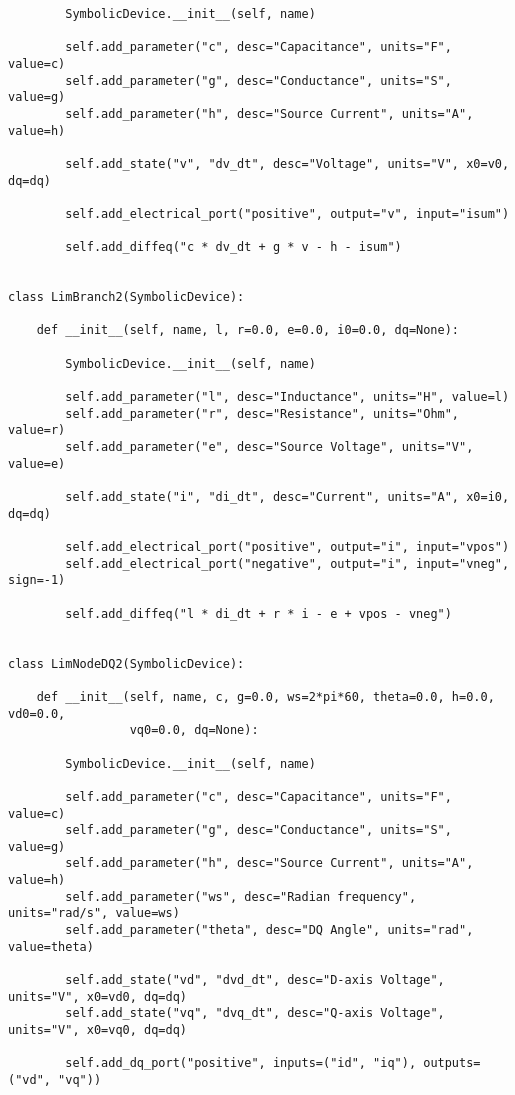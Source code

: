 \begin{lstlisting}
        SymbolicDevice.__init__(self, name)

        self.add_parameter("c", desc="Capacitance", units="F", value=c)
        self.add_parameter("g", desc="Conductance", units="S", value=g)
        self.add_parameter("h", desc="Source Current", units="A", value=h)

        self.add_state("v", "dv_dt", desc="Voltage", units="V", x0=v0, dq=dq)

        self.add_electrical_port("positive", output="v", input="isum")

        self.add_diffeq("c * dv_dt + g * v - h - isum")


class LimBranch2(SymbolicDevice):

    def __init__(self, name, l, r=0.0, e=0.0, i0=0.0, dq=None):

        SymbolicDevice.__init__(self, name)

        self.add_parameter("l", desc="Inductance", units="H", value=l)
        self.add_parameter("r", desc="Resistance", units="Ohm", value=r)
        self.add_parameter("e", desc="Source Voltage", units="V", value=e)

        self.add_state("i", "di_dt", desc="Current", units="A", x0=i0, dq=dq)

        self.add_electrical_port("positive", output="i", input="vpos")
        self.add_electrical_port("negative", output="i", input="vneg", sign=-1)

        self.add_diffeq("l * di_dt + r * i - e + vpos - vneg")


class LimNodeDQ2(SymbolicDevice):

    def __init__(self, name, c, g=0.0, ws=2*pi*60, theta=0.0, h=0.0, vd0=0.0,
                 vq0=0.0, dq=None):

        SymbolicDevice.__init__(self, name)

        self.add_parameter("c", desc="Capacitance", units="F", value=c)
        self.add_parameter("g", desc="Conductance", units="S", value=g)
        self.add_parameter("h", desc="Source Current", units="A", value=h)
        self.add_parameter("ws", desc="Radian frequency", units="rad/s", value=ws)
        self.add_parameter("theta", desc="DQ Angle", units="rad", value=theta)

        self.add_state("vd", "dvd_dt", desc="D-axis Voltage", units="V", x0=vd0, dq=dq)
        self.add_state("vq", "dvq_dt", desc="Q-axis Voltage", units="V", x0=vq0, dq=dq)

        self.add_dq_port("positive", inputs=("id", "iq"), outputs=("vd", "vq"))


\end{lstlisting}
